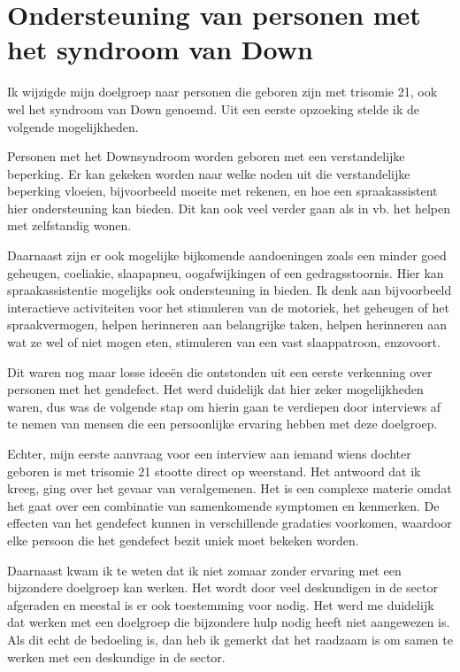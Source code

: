 \section{Ondersteuning van personen met het syndroom van Down}
\label{ondersteuning van personen met het syndroom van Down}
Ik wijzigde mijn doelgroep naar personen die geboren zijn met trisomie 21, ook wel het syndroom van Down genoemd. Uit een eerste opzoeking stelde ik de volgende mogelijkheden.

Personen met het Downsyndroom worden geboren met een verstandelijke beperking. Er kan gekeken worden naar welke noden uit die verstandelijke beperking vloeien, bijvoorbeeld moeite met rekenen, en hoe een spraakassistent hier ondersteuning kan bieden. Dit kan ook veel verder gaan als in vb. het helpen met zelfstandig wonen.

Daarnaast zijn er ook mogelijke bijkomende aandoeningen zoals een minder goed geheugen, coeliakie, slaapapneu, oogafwijkingen of een gedragsstoornis. Hier kan spraakassistentie mogelijks ook ondersteuning in bieden. Ik denk aan bijvoorbeeld interactieve activiteiten voor het stimuleren van de motoriek, het geheugen of het spraakvermogen, helpen herinneren aan belangrijke taken, helpen herinneren aan wat ze wel of niet mogen eten, stimuleren van een vast slaappatroon, enzovoort. \autocite{Volksgezondheidenzorg2019}

Dit waren nog maar losse ideeën die ontstonden uit een eerste verkenning over personen met het gendefect. Het werd duidelijk dat hier zeker mogelijkheden waren, dus was de volgende stap om hierin gaan te verdiepen door interviews af te nemen van mensen die een persoonlijke ervaring hebben met deze doelgroep.

Echter, mijn eerste aanvraag voor een interview aan iemand wiens dochter geboren is met trisomie 21 stootte direct op weerstand. Het antwoord dat ik kreeg, ging over het gevaar van veralgemenen. Het is een complexe materie omdat het gaat over een combinatie van samenkomende symptomen en kenmerken. De effecten van het gendefect kunnen in verschillende gradaties voorkomen, waardoor elke persoon die het gendefect bezit uniek moet bekeken worden.

Daarnaast kwam ik te weten dat ik niet zomaar zonder ervaring met een bijzondere doelgroep kan werken. Het wordt door veel deskundigen in de sector afgeraden en meestal is er ook toestemming voor nodig.
Het werd me duidelijk dat werken met een doelgroep die bijzondere hulp nodig heeft niet aangewezen is. Als dit echt de bedoeling is, dan heb ik gemerkt dat het raadzaam is om samen te werken met een deskundige in de sector.

